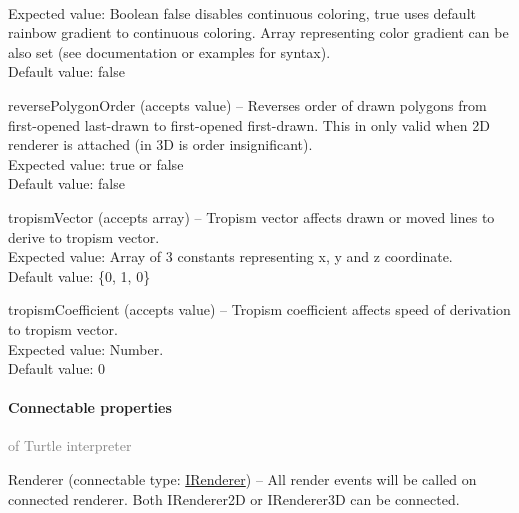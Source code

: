 \begin{description*}
			\\ Expected value: Boolean false disables continuous coloring, true uses default rainbow gradient to continuous coloring.
            	Array representing color gradient can be also set (see documentation or examples for syntax).
			\\ Default value: false
		\item[reversePolygonOrder]
		(accepts value)
			-- Reverses order of drawn polygons from first-opened last-drawn to first-opened first-drawn.
            This in only valid when 2D renderer is attached (in 3D is order insignificant).
			\\ Expected value: true or false
			\\ Default value: false
		\item[tropismVector]
		(accepts array)
			-- Tropism vector affects drawn or moved lines to derive to tropism vector.
			\\ Expected value: Array of 3 constants representing x, y and z coordinate.
			\\ Default value: \{0, 1, 0\}
		\item[tropismCoefficient]
		(accepts value)
			-- Tropism coefficient affects speed of derivation to tropism vector.
			\\ Expected value: Number.
			\\ Default value: 0
	\end{description*}
	\paragraph{Connectable properties}\textcolor{gray}{of Turtle interpreter}
	\begin{description*}
		\item[Renderer]
		(connectable type:  \hyperref[Malsys.Processing.Components.IRenderer]{IRenderer})
			-- All render events will be called on connected renderer.
            Both IRenderer2D or IRenderer3D can be connected.
	\end{description*}

